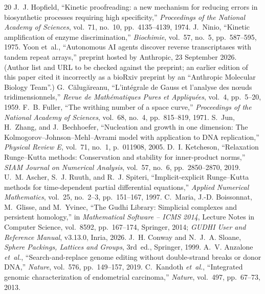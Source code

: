 \documentclass[11pt,a4paper]{article}
\theoremstyle{definition}
\begin{document}
\begin{thebibliography}{20}
J.~J. Hopfield, ``Kinetic proofreading: a new mechanism for reducing errors in biosynthetic processes requiring high specificity,'' \emph{Proceedings of the National Academy of Sciences}, vol.~71, no.~10, pp.~4135--4139, 1974.
J.~Ninio, ``Kinetic amplification of enzyme discrimination,'' \emph{Biochimie}, vol.~57, no.~5, pp.~587--595, 1975.
Yoon et~al., ``Autonomous AI agents discover reverse transcriptases with tandem repeat arrays,'' preprint hosted by Anthropic, 23 September 2026. (Author list and URL to be checked against the preprint; an earlier edition of this paper cited it incorrectly as a bioRxiv preprint by an ``Anthropic Molecular Biology Team''.)
G.~C\u{a}lug\u{a}reanu, ``L'int\'egrale de Gauss et l'analyse des n\oe uds tridimensionnels,'' \emph{Revue de Math\'ematiques Pures et Appliqu\'ees}, vol.~4, pp.~5--20, 1959.
F.~B. Fuller, ``The writhing number of a space curve,'' \emph{Proceedings of the National Academy of Sciences}, vol.~68, no.~4, pp.~815--819, 1971.
S.~Jun, H.~Zhang, and J.~Bechhoefer, ``Nucleation and growth in one dimension: The Kolmogorov--Johnson--Mehl--Avrami model with application to DNA replication,'' \emph{Physical Review E}, vol.~71, no.~1, p.~011908, 2005.
D.~I. Ketcheson, ``Relaxation Runge--Kutta methods: Conservation and stability for inner-product norms,'' \emph{SIAM Journal on Numerical Analysis}, vol.~57, no.~6, pp.~2850--2870, 2019.
U.~M. Ascher, S.~J. Ruuth, and R.~J. Spiteri, ``Implicit-explicit Runge--Kutta methods for time-dependent partial differential equations,'' \emph{Applied Numerical Mathematics}, vol.~25, no.~2--3, pp.~151--167, 1997.
C.~Maria, J.-D. Boissonnat, M.~Glisse, and M.~Yvinec, ``The Gudhi Library: Simplicial complexes and persistent homology,'' in \emph{Mathematical Software -- ICMS 2014}, Lecture Notes in Computer Science, vol.~8592, pp.~167--174, Springer, 2014; \emph{GUDHI User and Reference Manual}, v3.13.0, Inria, 2026.
J.~H. Conway and N.~J.~A. Sloane, \emph{Sphere Packings, Lattices and Groups}, 3rd~ed., Springer, 1999.
A.~V. Anzalone \emph{et~al.}, ``Search-and-replace genome editing without double-strand breaks or donor DNA,'' \emph{Nature}, vol.~576, pp.~149--157, 2019.
C.~Kandoth \emph{et~al.}, ``Integrated genomic characterization of endometrial carcinoma,'' \emph{Nature}, vol.~497, pp.~67--73, 2013.

\end{thebibliography}
\end{document}
